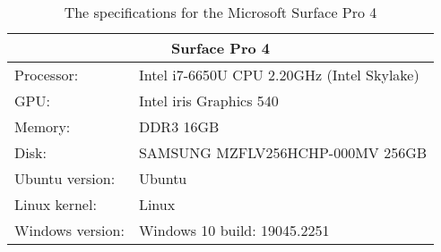 \begin{table}[H]
    \begin{tabular}{ll}
    \hline
    \multicolumn{2}{|c|}{Surface Pro 4}           \\ \hline
    Processor: & Intel i7-6650U CPU 2.20GHz (Intel Skylake) \\
    GPU:       & Intel iris Graphics 540          \\
    Memory:    & DDR3 16GB                         \\
    Disk:      & SAMSUNG MZFLV256HCHP-000MV 256GB   \\
    Ubuntu version:  & Ubuntu                            \\
    Linux kernel: & Linux        \\
    Windows version:& Windows 10 build: 19045.2251
    \end{tabular}
    \caption{The specifications for the Microsoft Surface Pro 4}
    \label{tab:surfacePro}
\end{table} 
